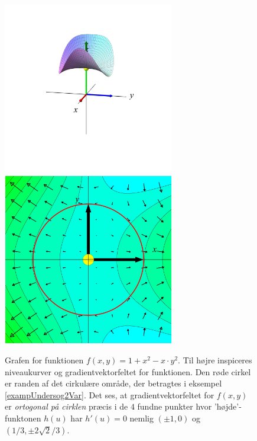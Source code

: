 \begin{figure}[ht]
\centerline{ \includegraphics[height=75mm]{plotVar2Fig6.pdf} \includegraphics[height=75mm]{plotNivBdry6.pdf}}
\begin{center}
\caption{Grafen for funktionen $f(x,y)= 1 + x^{2} - x\cdot y^{2}$. Til højre inspiceres niveaukurver og gradientvektorfeltet for funktionen. Den røde cirkel er randen af det cirkulære område, der betragtes i eksempel \ref{exampUndersog2Var}. Det ses, at gradientvektorfeltet for $f(x,y)$ er {\textit{ortogonal på cirklen}} præcis i de $4$ fundne punkter hvor 'højde'-funktonen $h(u)$ har $h'(u)=0$ nemlig $(\pm 1,0)$ og $(1/3, \pm 2\sqrt{2}/3)$.} \label{figCirkVaerdi}
\end{center}
\end{figure}








